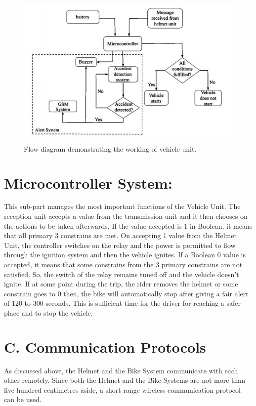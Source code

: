 \begin{figure}[h]
	\centering
	\includegraphics[width=0.7\linewidth]{"images/vehicle unit working"}
	\captionsetup{labelformat=empty}
	\caption[]{Flow diagram demonstrating the working of vehicle unit.}
\end{figure}

\section*{Microcontroller System: }
This sub-part manages the most important functions of the Vehicle Unit. The reception unit accepts a value from the transmission unit and it then chooses on the actions to be taken afterwards. If the value accepted is 1 in Boolean, it means that all primary 3 constrains are met. On accepting 1 value from the Helmet Unit, the controller switches on the relay and the power is permitted to flow through the ignition system and then the vehicle ignites. If a Boolean 0 value is accepted, it means that some constrains from the 3 primary constrains are not satisfied. So, the switch of the relay remains tuned off and the vehicle doesn’t ignite. If at some point during the trip, the rider removes the helmet or some constrain goes to 0 then, the bike will automatically stop after giving a fair alert of 120 to 300 seconds. This is sufficient time for the driver for reaching a safer place and to stop the vehicle.

\section*{C. Communication Protocols}
As discussed above, the Helmet and the Bike System communicate with each other remotely. Since both the Helmet and the Bike Systems are not more than five hundred centimetres aside, a short-range wireless communication protocol can be used.\vspace{.3cm}

